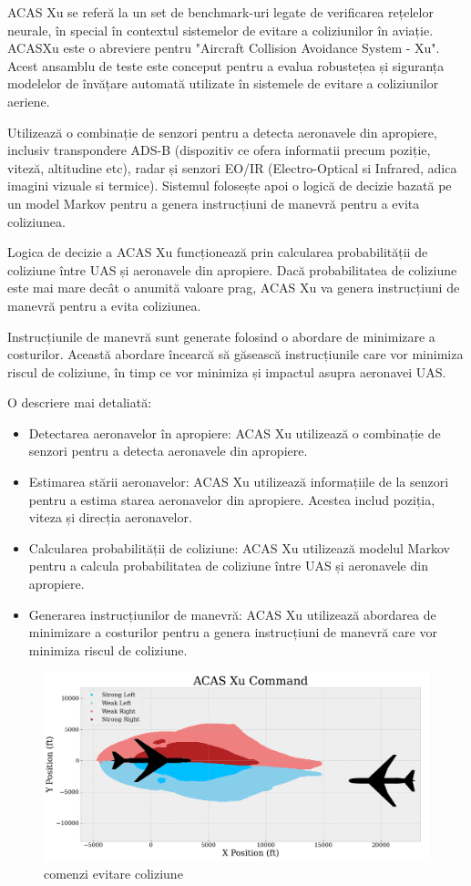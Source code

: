 \documentclass[12pt,a4paper]{article}
\begin{document}
ACAS Xu se referă la un set de benchmark-uri legate de verificarea rețelelor neurale, în special în contextul sistemelor de evitare a coliziunilor în aviație. ACASXu este o abreviere pentru "Aircraft Collision Avoidance System - Xu". Acest ansamblu de teste este conceput pentru a evalua robustețea și siguranța modelelor de învățare automată utilizate în sistemele de evitare a coliziunilor aeriene.\cite{acasxu}

Utilizează o combinație de senzori pentru a detecta aeronavele din apropiere, inclusiv transpondere ADS-B (dispozitiv ce ofera informatii precum poziție, viteză, altitudine etc), radar și senzori EO/IR (Electro-Optical si Infrared, adica imagini vizuale si termice). Sistemul folosește apoi o logică de decizie bazată pe un model Markov pentru a genera instrucțiuni de manevră pentru a evita coliziunea.

Logica de decizie a ACAS Xu funcționează prin calcularea probabilității de coliziune între UAS și aeronavele din apropiere. Dacă probabilitatea de coliziune este mai mare decât o anumită valoare prag, ACAS Xu va genera instrucțiuni de manevră pentru a evita coliziunea.

Instrucțiunile de manevră sunt generate folosind o abordare de minimizare a costurilor. Această abordare încearcă să găsească instrucțiunile care vor minimiza riscul de coliziune, în timp ce vor minimiza și impactul asupra aeronavei UAS.

O descriere mai detaliată:

\begin{itemize}
  \item
    Detectarea aeronavelor în apropiere: ACAS Xu utilizează o combinație de senzori pentru a detecta aeronavele din apropiere.
  \item Estimarea stării aeronavelor: ACAS Xu utilizează informațiile de la senzori pentru a estima starea aeronavelor din apropiere. Acestea includ poziția, viteza și direcția aeronavelor.
  \item Calcularea probabilității de coliziune: ACAS Xu utilizează modelul Markov pentru a calcula probabilitatea de coliziune între UAS și aeronavele din apropiere.
   \item Generarea instrucțiunilor de manevră: ACAS Xu utilizează abordarea de minimizare a costurilor pentru a genera instrucțiuni de manevră care vor minimiza riscul de coliziune.
\end{itemize}
\begin{figure}
\includegraphics[scale=0.4]{headon.png}
\caption{comenzi evitare coliziune}
\end{figure}
\end{document}
